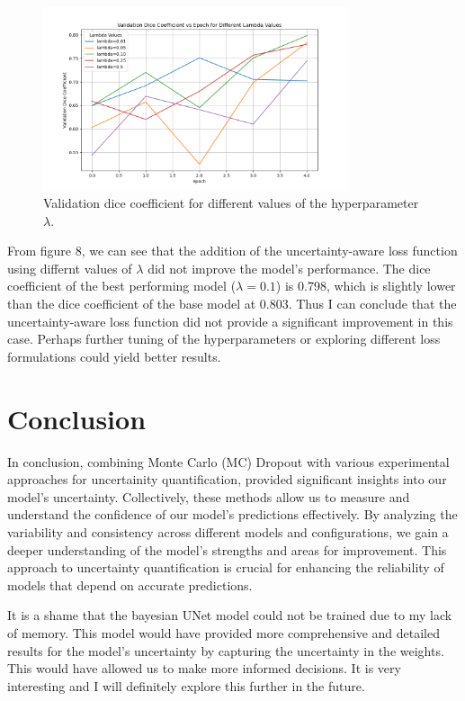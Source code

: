 \documentclass{article}
\begin{document}
\begin{figure}[h]
    \centering
    \includegraphics[width=0.8\textwidth]{../images/uncertainity aware loss funcs/diff_lambvda_values_graph.png}
    \caption{Validation dice coefficient for different values of the hyperparameter \(\lambda\).}
    \label{fig:uncertainty_aware_loss}
\end{figure}

From figure 8, we can see that the addition of the uncertainty-aware loss function using differnt values of \(\lambda\)
did not improve the model's performance. The dice coefficient of the best performing model (\(\lambda = 0.1\)) is 0.798, 
which is slightly lower than the dice coefficient of the base model at 0.803. Thus I can conclude that the uncertainty-aware
loss function did not provide a significant improvement in this case. Perhaps further tuning of the hyperparameters or
exploring different loss formulations could yield better results.

\section{Conclusion}

In conclusion, combining Monte Carlo (MC) Dropout with various experimental approaches for uncertainity quantification, 
provided significant insights into our model's uncertainty. Collectively, these methods allow us to measure and 
understand the confidence of our model's predictions 
effectively. By analyzing the variability and consistency across different models and configurations, we gain a deeper 
understanding of the model's strengths and areas for improvement. This approach to uncertainty quantification is crucial 
for enhancing the reliability of models that depend on accurate predictions.
\vspace{1em}

It is a shame that the bayesian UNet model could not be trained due to my lack of memory. This model would have
provided more comprehensive and detailed results for the model's uncertainty by capturing the uncertainty in the weights. 
This would have allowed us to make more informed decisions. It is very interesting and I will definitely 
explore this further in the future.
\end{document}
